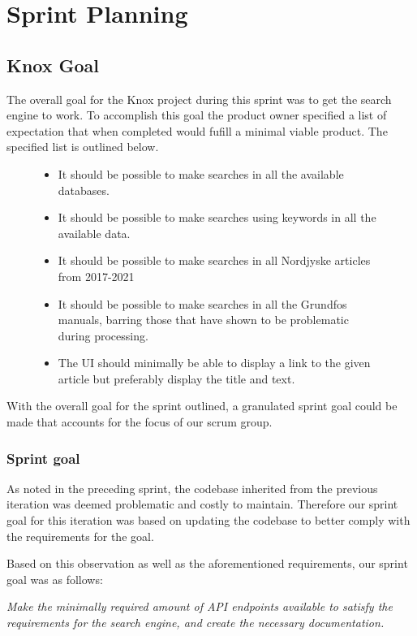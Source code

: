 \section{Sprint Planning}
\subsection{Knox Goal}\label{ssec:sprint3Goal}
The overall goal for the Knox project during this sprint was to get the search engine to work. To accomplish this goal the product owner specified a list of expectation that when completed would fufill a minimal viable product. The specified list is outlined below.
\begin{figure}
\begin{itemize}
	\item It should be possible to make searches in all the available databases.
	\item It should be possible to make searches using keywords in all the available data.
	\item It should be possible to make searches in all Nordjyske articles from 2017-2021
	\item It should be possible to make searches in all the Grundfos manuals, barring those that have shown to be problematic during processing.
	\item The UI should minimally be able to display a link to the given article but preferably display the title and text.
\end{itemize}
\end{figure}
With the overall goal for the sprint outlined, a granulated sprint goal could be made that accounts for the focus of our scrum group.

\subsubsection{Sprint goal}
As noted in the preceding sprint, the codebase inherited from the previous iteration was deemed problematic and costly to maintain. 
Therefore our sprint goal for this iteration was based on updating the codebase to better comply with the requirements for the \knox{} goal.


Based on this observation as well as the aforementioned requirements, our sprint goal was as follows:
\vspace{\baselineskip}

\textit{Make the minimally required amount of API endpoints available to satisfy the requirements for the search engine, and create the necessary documentation.}


